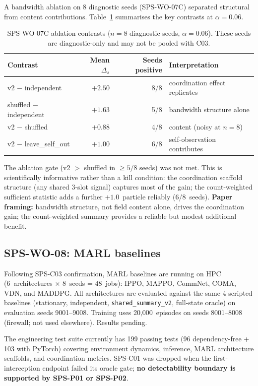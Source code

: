 \documentclass{article}
\begin{document}
A bandwidth ablation on 8 diagnostic seeds (SPS-WO-07C) separated structural
from content contributions. Table~\ref{tab:ablation} summarises the key
contrasts at $\alpha=0.06$.

\begin{table}[ht]
\centering
\caption{SPS-WO-07C ablation contrasts ($n=8$ diagnostic seeds, $\alpha=0.06$).
These seeds are diagnostic-only and may not be pooled with C03.}
\label{tab:ablation}
\begin{tabular}{lrrl}
\toprule
Contrast & Mean $\Delta_s$ & Seeds positive & Interpretation \\
\midrule
v2 $-$ independent   & $+2.50$ & 8/8 & coordination effect replicates \\
shuffled $-$ independent & $+1.63$ & 5/8 & bandwidth structure alone \\
v2 $-$ shuffled       & $+0.88$ & 4/8 & content (noisy at $n=8$) \\
v2 $-$ leave\_self\_out & $+1.00$ & 6/8 & self-observation contributes \\
\bottomrule
\end{tabular}
\end{table}

The ablation gate (v2 $>$ shuffled in $\geq5/8$ seeds) was not met. This is
scientifically informative rather than a kill condition: the coordination
scaffold structure (any shared 3-slot signal) captures most of the gain;
the count-weighted sufficient statistic adds a further $+1.0$~particle
reliably (6/8~seeds). \textbf{Paper framing:} bandwidth structure, not field
content alone, drives the coordination gain; the count-weighted summary
provides a reliable but modest additional benefit.

\subsection*{SPS-WO-08: MARL baselines}

Following SPS-C03 confirmation, MARL baselines are running on HPC
(6~architectures $\times$ 8~seeds = 48~jobs):
IPPO, MAPPO, CommNet, COMA, VDN, and MADDPG. All architectures are evaluated
against the same 4 scripted baselines (stationary, independent,
\texttt{shared\_summary\_v2}, full-state oracle) on evaluation seeds
9001--9008. Training uses 20,000~episodes on seeds 8001--8008 (firewall; not
used elsewhere). Results pending.

The engineering test suite currently has 199 passing tests (96 dependency-free
+ 103 with PyTorch) covering environment dynamics, inference, MARL architecture
scaffolds, and coordination metrics. SPS-C01 was dropped when the
first-interception endpoint failed its oracle gate;
\textbf{no detectability boundary is supported by SPS-P01 or SPS-P02}.
\end{document}
